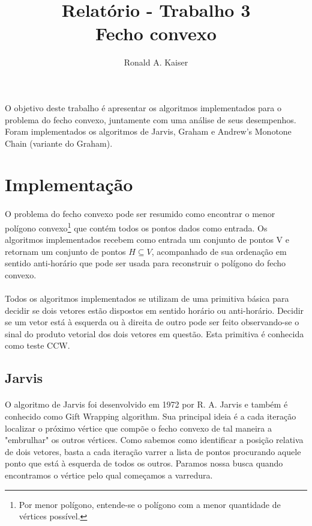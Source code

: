 \documentclass[11pt,a4paper]{article}
\title{Relatório - Trabalho 3 \\ Fecho convexo}
\author{Ronald A. Kaiser}
\begin{document}
    \maketitle

    \paragraph{}
    O objetivo deste trabalho é apresentar os algoritmos implementados para o problema do fecho convexo, juntamente com uma análise de seus desempenhos. Foram implementados os algoritmos de Jarvis, Graham e Andrew's Monotone Chain (variante do Graham).

    \section{Implementação}
    \paragraph{}
    O problema do fecho convexo pode ser resumido como encontrar o menor polígono convexo\footnote{Por menor polígono, entende-se o polígono com a menor quantidade de vértices possível.} que contém todos os pontos dados como entrada. Os algoritmos implementados recebem como entrada um conjunto de pontos V e retornam um conjunto de pontos $H \subseteq V$, acompanhado de sua ordenação em sentido anti-horário que pode ser usada para reconstruir o polígono do fecho convexo. 

    \paragraph{}
    Todos os algoritmos implementados se utilizam de uma primitiva básica para decidir se dois vetores estão dispostos em sentido horário ou anti-horário. Decidir se um vetor está à esquerda ou à direita de outro pode ser feito observando-se o sinal do produto vetorial dos dois vetores em questão. Esta primitiva é conhecida como teste CCW.

    \subsection{Jarvis}
    \paragraph{}
    O algoritmo de Jarvis foi desenvolvido em 1972 por R. A. Jarvis e também é conhecido como Gift Wrapping algorithm. Sua principal ideia é a cada iteração localizar o próximo vértice que compõe o fecho convexo de tal maneira a "embrulhar" os outros vértices. Como sabemos como identificar a posição relativa de dois vetores, basta a cada iteração varrer a lista de pontos procurando aquele ponto que está à esquerda de todos os outros. Paramos nossa busca quando encontramos o vértice pelo qual começamos a varredura.
\end{document}
